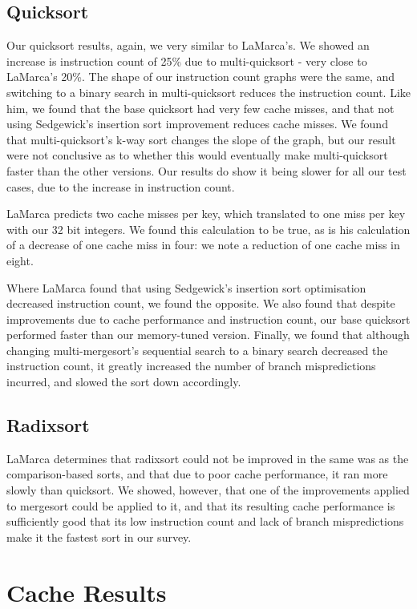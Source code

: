 \subsection{Quicksort}

Our quicksort results, again, we very similar to LaMarca's. We showed an
increase is instruction count of 25\% due to multi-quicksort - very close to
LaMarca's 20\%.  The shape of our instruction count graphs were the same, and
switching to a binary search in multi-quicksort reduces the instruction count.
Like him, we found that the base quicksort had very few cache misses, and that
not using Sedgewick's insertion sort improvement reduces cache misses. We found
that multi-quicksort's k-way sort changes the slope of the graph, but our
result were not conclusive as to whether this would eventually make
multi-quicksort faster than the other versions. Our results do show it being
slower for all our test cases, due to the increase in instruction count.

LaMarca predicts two cache misses per key, which translated to one miss per key
with our 32 bit integers. We found this calculation to be true, as is his
calculation of a decrease of one cache miss in four: we note a reduction of one
cache miss in eight.

Where LaMarca found that using Sedgewick's insertion sort optimisation decreased
instruction count, we found the opposite. We also found that despite
improvements due to cache performance and instruction count, our base quicksort
performed faster than our memory-tuned version. Finally, we found that although
changing multi-mergesort's sequential search to a binary search decreased the
instruction count, it greatly increased the number of branch mispredictions
incurred, and slowed the sort down accordingly.

\subsection{Radixsort}

LaMarca determines that radixsort could not be improved in the same was as the
comparison-based sorts, and that due to poor cache performance, it ran more
slowly than quicksort. We showed, however, that one of the improvements applied
to mergesort could be applied to it, and that its resulting cache performance is
sufficiently good that its low instruction count and lack of branch
mispredictions make it the fastest sort in our survey.


\section{Cache Results}

